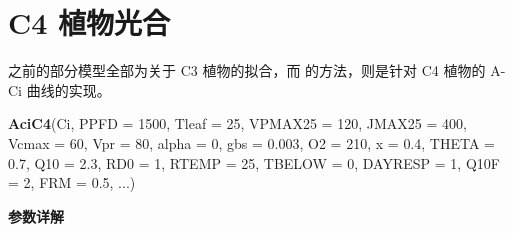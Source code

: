 \documentclass[
]{krantz}
\makeatletter
\newenvironment{Shaded}{\begin{snugshade}}{\end{snugshade}}
\newcommand{\DataTypeTok}[1]{\textcolor[rgb]{0.13,0.29,0.53}{#1}}
\newcommand{\DecValTok}[1]{\textcolor[rgb]{0.00,0.00,0.81}{#1}}
\newcommand{\FloatTok}[1]{\textcolor[rgb]{0.00,0.00,0.81}{#1}}
\newcommand{\KeywordTok}[1]{\textcolor[rgb]{0.13,0.29,0.53}{\textbf{#1}}}
\newcommand{\NormalTok}[1]{#1}
\newenvironment{kframe}{%
\medskip{}
\setlength{\fboxsep}{.8em}
 \def\at@end@of@kframe{}%
 \ifinner\ifhmode%
  \def\at@end@of@kframe{\end{minipage}}%
  \begin{minipage}{\columnwidth}%
 \fi\fi%
 \def\FrameCommand##1{\hskip\@totalleftmargin \hskip-\fboxsep
 \colorbox{shadecolor}{##1}\hskip-\fboxsep
     \hskip-\linewidth \hskip-\@totalleftmargin \hskip\columnwidth}%
 \MakeFramed {\advance\hsize-\width
   \@totalleftmargin\z@ \linewidth\hsize
   \@setminipage}}%
 {\par\unskip\endMakeFramed%
 \at@end@of@kframe}
\renewenvironment{Shaded}{\begin{kframe}}{\end{kframe}}
\makeatother
\begin{document}
\cleardoublepage

\hypertarget{c4}{%
\section{C4 植物光合}\label{c4}}

之前的部分模型全部为关于 C3 植物的拟合，而 \citet{Caemmerer2000Biochemical} 的方法，则是针对
C4 植物的 A-Ci 曲线的实现。

\begin{Shaded}
\begin{Highlighting}[]
\KeywordTok{AciC4}\NormalTok{(Ci, }\DataTypeTok{PPFD =} \DecValTok{1500}\NormalTok{, }\DataTypeTok{Tleaf =} \DecValTok{25}\NormalTok{, }\DataTypeTok{VPMAX25 =} \DecValTok{120}\NormalTok{, }
      \DataTypeTok{JMAX25 =} \DecValTok{400}\NormalTok{, }\DataTypeTok{Vcmax =} \DecValTok{60}\NormalTok{, }\DataTypeTok{Vpr =} \DecValTok{80}\NormalTok{, }
      \DataTypeTok{alpha =} \DecValTok{0}\NormalTok{, }\DataTypeTok{gbs =} \FloatTok{0.003}\NormalTok{, }\DataTypeTok{O2 =} \DecValTok{210}\NormalTok{, }
      \DataTypeTok{x =} \FloatTok{0.4}\NormalTok{, }\DataTypeTok{THETA =} \FloatTok{0.7}\NormalTok{, }\DataTypeTok{Q10 =} \FloatTok{2.3}\NormalTok{, }
      \DataTypeTok{RD0 =} \DecValTok{1}\NormalTok{, }\DataTypeTok{RTEMP =} \DecValTok{25}\NormalTok{, }\DataTypeTok{TBELOW =} \DecValTok{0}\NormalTok{, }
      \DataTypeTok{DAYRESP =} \DecValTok{1}\NormalTok{, }\DataTypeTok{Q10F =} \DecValTok{2}\NormalTok{, }\DataTypeTok{FRM =} \FloatTok{0.5}\NormalTok{, ...)}
\end{Highlighting}
\end{Shaded}

\textbf{参数详解}
\end{document}

